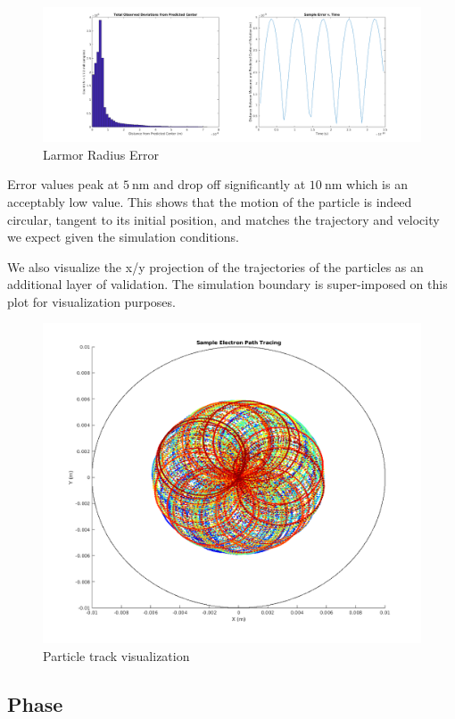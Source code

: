 \documentclass[12pt,letterpaper]{article}
\begin{document}
    \begin{figure}[H]
    \centering
    \includegraphics[width=\linewidth]{img/larmor.png}
    \caption{Larmor Radius Error}
    \end{figure}
    

Error values peak at $5~$nm and drop off significantly at $10~$nm which is an acceptably low value. This shows that the motion of the particle is indeed circular, tangent to its initial position, and matches the trajectory and velocity we expect given the simulation conditions. 

We also visualize the x/y projection of the trajectories of the particles as an additional layer of validation. The simulation boundary is super-imposed on this plot for visualization purposes. 

    \begin{figure}[H]
    \centering
    \includegraphics[width=0.9\linewidth]{img/track.png}
    \caption{Particle track visualization}
    \end{figure}

\subsection{Phase}
    
\end{document}
